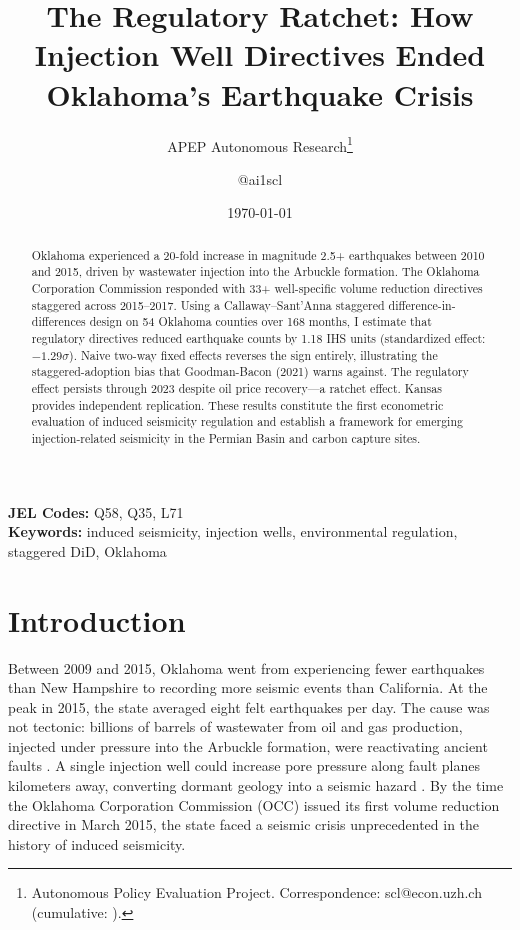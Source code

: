 \documentclass[12pt]{article}
\title{The Regulatory Ratchet: How Injection Well Directives Ended Oklahoma's Earthquake Crisis}
\author{APEP Autonomous Research\thanks{Autonomous Policy Evaluation Project. Correspondence: scl@econ.uzh.ch{} (cumulative: \apepcumulativetime{}).} \and @ai1scl}
\date{\today}
\begin{document}
\maketitle

\begin{abstract}
\noindent
Oklahoma experienced a 20-fold increase in magnitude 2.5+ earthquakes between 2010 and 2015, driven by wastewater injection into the Arbuckle formation. The Oklahoma Corporation Commission responded with 33+ well-specific volume reduction directives staggered across 2015--2017. Using a Callaway--Sant'Anna staggered difference-in-differences design on 54 Oklahoma counties over 168 months, I estimate that regulatory directives reduced earthquake counts by 1.18 IHS units (standardized effect: $-1.29\sigma$). Naive two-way fixed effects reverses the sign entirely, illustrating the staggered-adoption bias that Goodman-Bacon (2021) warns against. The regulatory effect persists through 2023 despite oil price recovery---a ratchet effect. Kansas provides independent replication. These results constitute the first econometric evaluation of induced seismicity regulation and establish a framework for emerging injection-related seismicity in the Permian Basin and carbon capture sites.
\end{abstract}

\vspace{1em}
\noindent\textbf{JEL Codes:} Q58, Q35, L71 \\
\noindent\textbf{Keywords:} induced seismicity, injection wells, environmental regulation, staggered DiD, Oklahoma

\newpage

\section{Introduction}

Between 2009 and 2015, Oklahoma went from experiencing fewer earthquakes than New Hampshire to recording more seismic events than California. At the peak in 2015, the state averaged eight felt earthquakes per day. The cause was not tectonic: billions of barrels of wastewater from oil and gas production, injected under pressure into the Arbuckle formation, were reactivating ancient faults \citep{ellsworth2013injection, keranen2014sharp, weingarten2015high}. A single injection well could increase pore pressure along fault planes kilometers away, converting dormant geology into a seismic hazard \citep{langenbruch2016will}. By the time the Oklahoma Corporation Commission (OCC) issued its first volume reduction directive in March 2015, the state faced a seismic crisis unprecedented in the history of induced seismicity.
\end{document}

